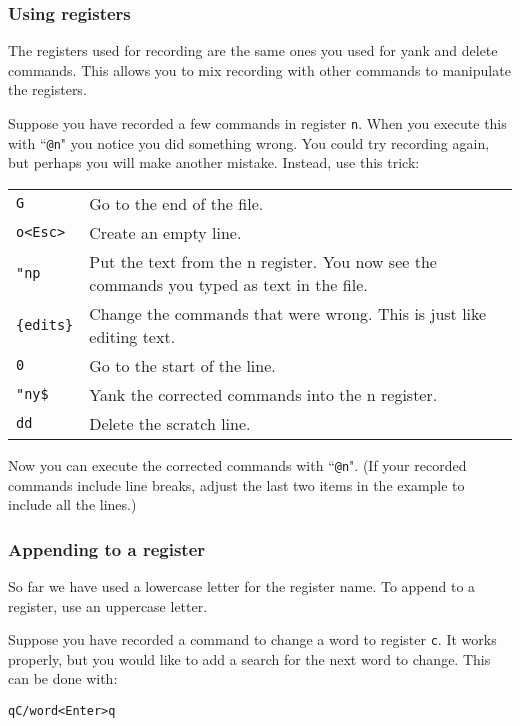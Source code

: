 \subsubsection{Using registers}
The registers used for recording are the same ones you used for yank and delete commands.
This allows you to mix recording with other commands to manipulate the registers.

Suppose you have recorded a few commands in register \texttt{n}.
When you execute this with ``\texttt{@n}" you notice you did something wrong.
You could try recording again, but perhaps you will make another mistake.
Instead, use this trick:

\begin{center}\begin{tabular}{l l}
				\texttt{G} & Go to the end of the file. \\
				\texttt{o<Esc>} & Create an empty line. \\
				\texttt{"np} & Put the text from the n register.  You now see the commands you typed as text in the file. \\
				\texttt{\{edits\}} & Change the commands that were wrong.  This is just like editing text. \\
				\texttt{0} & Go to the start of the line. \\
				\texttt{"ny\$} & Yank the corrected commands into the n register. \\
				\texttt{dd} & Delete the scratch line. \\
\end{tabular}\end{center}

Now you can execute the corrected commands with ``\texttt{@n}".
(If your recorded commands include line breaks, adjust the last two items in the example to include all the lines.)
\subsubsection{Appending to a register}
So far we have used a lowercase letter for the register name.
To append to a register, use an uppercase letter.

Suppose you have recorded a command to change a word to register \texttt{c}.
It works properly, but you would like to add a search for the next word to change.
This can be done with:

\begin{Verbatim}[samepage=true]
 qC/word<Enter>q
\end{Verbatim}

